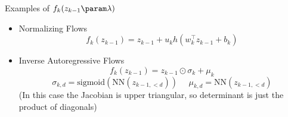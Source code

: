 \begin{frame}
Examples of $f_k(z_{k-1} \param \lambda )$
\begin{itemize}
    \item Normalizing Flows \citep{Rezende2015} 
    \[f_k(z_{k-1}) =  z_{k-1} + u_k h(w_k^\top z_{k-1} + b_k)\]
    \item Inverse Autoregressive Flows \citep{Kingma2016}
    \[ f_k(z_{k-1}) = z_{k-1} \odot \sigma_{k} + \mu_{k} \]
    \[ \sigma_{k, d} = \text{sigmoid}(\text{NN}(z_{k-1, <d})) \,\,\,\,\,\,\,\, \mu_{k, d} = \text{NN}(z_{k-1, <d})\]
    (In this case the Jacobian is upper triangular, so determinant is just the product of diagonals)
\end{itemize}
\end{frame} 

